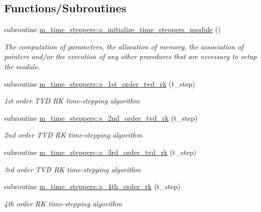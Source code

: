 \subsection*{Functions/\+Subroutines}
\begin{DoxyCompactItemize}
\item 
subroutine \hyperlink{namespacem__time__steppers_a9287671ffb47dce60f906e5d885fb96f}{m\+\_\+time\+\_\+steppers\+::s\+\_\+initialize\+\_\+time\+\_\+steppers\+\_\+module} ()
\begin{DoxyCompactList}\small\item\em The computation of parameters, the allocation of memory, the association of pointers and/or the execution of any other procedures that are necessary to setup the module. \end{DoxyCompactList}\item 
subroutine \hyperlink{namespacem__time__steppers_a1057850f94e9e749da9687baa7478246}{m\+\_\+time\+\_\+steppers\+::s\+\_\+1st\+\_\+order\+\_\+tvd\+\_\+rk} (t\+\_\+step)
\begin{DoxyCompactList}\small\item\em 1st order T\+VD RK time-\/stepping algorithm \end{DoxyCompactList}\item 
subroutine \hyperlink{namespacem__time__steppers_a5b758874c713da801a47aa3d6246b2fd}{m\+\_\+time\+\_\+steppers\+::s\+\_\+2nd\+\_\+order\+\_\+tvd\+\_\+rk} (t\+\_\+step)
\begin{DoxyCompactList}\small\item\em 2nd order T\+VD RK time-\/stepping algorithm \end{DoxyCompactList}\item 
subroutine \hyperlink{namespacem__time__steppers_a1cc10f406268344cc54a55159c4ff08f}{m\+\_\+time\+\_\+steppers\+::s\+\_\+3rd\+\_\+order\+\_\+tvd\+\_\+rk} (t\+\_\+step)
\begin{DoxyCompactList}\small\item\em 3rd order T\+VD RK time-\/stepping algorithm \end{DoxyCompactList}\item 
subroutine \hyperlink{namespacem__time__steppers_ac53b0d079d514df2bf662bc0e042c8db}{m\+\_\+time\+\_\+steppers\+::s\+\_\+4th\+\_\+order\+\_\+rk} (t\+\_\+step)
\begin{DoxyCompactList}\small\item\em 4th order RK time-\/stepping algorithm \end{DoxyCompactList}\item 

\end{DoxyCompactItemize}
